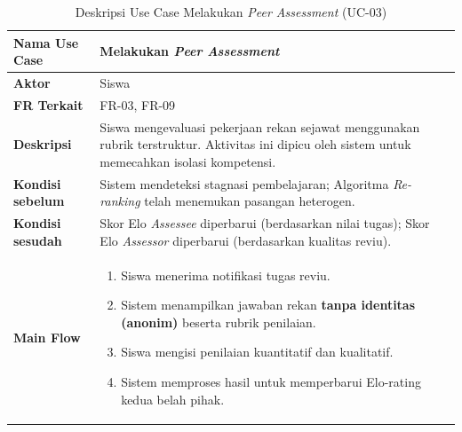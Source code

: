 \begin{table}[H]
    \centering
    \caption{Deskripsi Use Case Melakukan \textit{Peer Assessment} (UC-03)}
    \label{tbl:desc_uc03}
    \begin{tabular}{|p{}|p{}|}
        \hline
        \textbf{Nama Use Case} & \textbf{Melakukan \textit{Peer Assessment}} \\
        \hline
        \textbf{Aktor} & Siswa \\
        \hline
        \textbf{FR Terkait} & FR-03, FR-09 \\
        \hline
        \textbf{Deskripsi} & Siswa mengevaluasi pekerjaan rekan sejawat menggunakan rubrik terstruktur. Aktivitas ini dipicu oleh sistem untuk memecahkan isolasi kompetensi. \\
        \hline
        \textbf{Kondisi sebelum} & Sistem mendeteksi stagnasi pembelajaran; Algoritma \textit{Re-ranking} telah menemukan pasangan heterogen. \\
        \hline
        \textbf{Kondisi sesudah} & Skor Elo \textit{Assessee} diperbarui (berdasarkan nilai tugas); Skor Elo \textit{Assessor} diperbarui (berdasarkan kualitas reviu). \\
        \hline
        \textbf{Main Flow} & \begin{enumerate}[noitemsep,topsep=0pt,leftmargin=*]
            \item Siswa menerima notifikasi tugas reviu.
            \item Sistem menampilkan jawaban rekan \textbf{tanpa identitas (anonim)} beserta rubrik penilaian.
            \item Siswa mengisi penilaian kuantitatif dan kualitatif.
            \item Sistem memproses hasil untuk memperbarui Elo-rating kedua belah pihak.
        \end{enumerate} \\
        \hline
    \end{tabular}
\end{table}